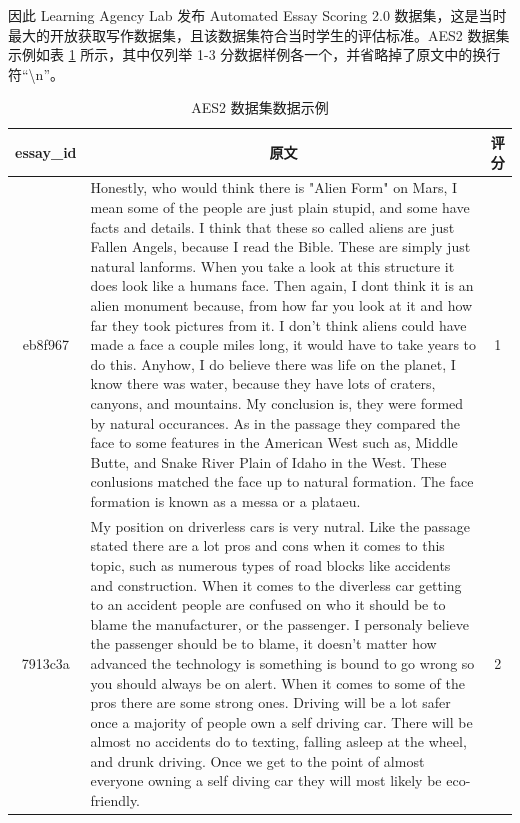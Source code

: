因此 Learning Agency Lab 发布 Automated Essay Scoring 2.0 数据集，这是当时最大的开放获取写作数据集，且该数据集符合当时学生的评估标准。AES2 数据集示例如表 \ref{tab:AES2-example} 所示，其中仅列举 1-3 分数据样例各一个，并省略掉了原文中的换行符“\textbackslash{}n”。

\begin{table}[htbp]
\caption{AES2 数据集数据示例} \label{tab:AES2-example}
\begin{tabular}{cp{13.3cm}c}
\toprule
\textbf{essay\_id} & \multicolumn{1}{c}{\textbf{原文}}  & \textbf{评分} \\ \midrule
eb8f967 & Honestly, who would think there   is "Alien Form" on Mars, I mean some of the people are just plain   stupid, and some have facts and details. I think that these so called aliens   are just Fallen Angels, because I read the Bible. These are simply just   natural lanforms. When you take a look at this structure it does look like   a humans face. Then again, I dont think it is an alien monument because, from   how far you look at it and how far they took pictures from it. I don't think   aliens could have made a face a couple miles long, it would have to take   years to do this. Anyhow, I do believe there was life on the planet, I know   there was water, because they have lots of craters, canyons, and   mountains. My conclusion is, they were formed by natural occurances. As in   the passage they compared the face to some features in the American West such   as, Middle Butte, and Snake River Plain of Idaho in the West. These   conlusions matched the face up to natural formation. The face formation is   known as a messa or a plataeu.  & 1  \\ \midrule
7913c3a & My position on driverless cars   is very nutral. Like the passage stated there are a lot pros and cons when it   comes to this topic, such as numerous types of road blocks like accidents and   construction. When it comes to the diverless car getting to an accident   people are confused on who it should be to blame the manufacturer, or the   passenger. I personaly believe the passenger should be to blame, it doesn't   matter how advanced the technology is something is bound to go wrong so you   should always be on alert. When it comes to some of the pros there are   some strong ones. Driving will be a lot safer once a majority of people own a   self driving car. There will be almost no accidents do to texting, falling   asleep at the wheel, and drunk driving. Once we get to the point of almost   everyone owning a self diving car they will most likely be eco-friendly. & 2  \\ \midrule

\end{tabular}
\end{table}
